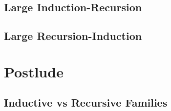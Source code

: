 \documentclass[12pt]{report}
\theoremstyle{definition}
\theoremstyle{remark}
\numberwithin{definition}{section}
\numberwithin{equation}{section}
\numberwithin{proposition}{section}
\numberwithin{conjecture}{section}
\numberwithin{theorem}{section}
\numberwithin{lemma}{section}
\numberwithin{corollary}{section}
\numberwithin{example}{section}
\numberwithin{remark}{section}
\begin{document}
\chapter{Large Induction-Recursion}\label{ch:largeir}
\chapter{Large Recursion-Induction}\label{ch:largeri}





\part{Postlude}\label{part:postlude}
\chapter{Inductive vs Recursive Families}\label{ch:related}
\end{document}
